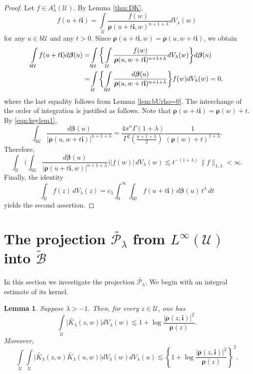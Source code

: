 \documentclass{amsart}
\newtheorem{lemma}[theorem]{Lemma}
\numberwithin{equation}{section}
\newcommand{\calU}{\mathcal{U}}
\newcommand{\bfi}{\mathbf{i}}
\newcommand{\bfbeta}{\boldsymbol{\beta}}
\newcommand{\bfrho}{\boldsymbol{\rho}}
\newcommand{\calB}{\mathcal{B}}
\newcommand{\bSieg}{b\mathcal{U}}
\begin{document}
\begin{proof}
Let $f\in A_{\lambda}^1(\calU)$. By Lemma \ref{thm:DK},
\[
f(u+t\bfi) =  \int\limits_{\calU} \frac {f(w)}{\bfrho(u+t\bfi,w)^{n+1+\lambda}} dV_{\lambda}(w)
\]
for any $u\in b\calU$ and any $t>0$. Since $\bfrho(u+t\bfi,w)=\bfrho(u,w+t\bfi)$, we obtain
\begin{align*}\label{eqn:cancel1}
\int\limits_{\bSieg} f(u+t\bfi) d\bfbeta(u) =&  \int\limits_{\bSieg} \bigg\{ \int\limits_{\calU}
\frac{f(w)} {\bfrho(u,w+t\bfi)^{n+1+\lambda}} dV_{\lambda}(w) \bigg\} d\bfbeta(u)\\
=&  \int\limits_{\calU} \bigg\{ \int\limits_{\bSieg}
\frac {d\bfbeta(u)} {\bfrho(u,w+t\bfi)^{n+1+\lambda}} \bigg\} f(w) dV_{\lambda}(w) =0, \notag
\end{align*}
where the last equality follows from Lemma \ref{lem:bUrho=0}.
The interchange of the order of integration is justified as follows. 
Note that $\bfrho(w+t\bfi)=\bfrho(w)+t$.
By \eqref{eqn:keylem1},
\[
\int_{b\calU}
\frac{d\bfbeta(u)}
     {|\bfrho(u,w+t\bfi)|^{n+1+\lambda}}
=
\frac{4\pi^n\Gamma(1+\lambda)}
     {\Gamma^2\!\left(\frac{n+1+\lambda}{2}\right)}
\frac{1}{(\bfrho(w)+t)^{1+\lambda}}.
\]
Therefore,
\[
\int_{\calU}
\Bigg(
\int_{b\calU}
\frac{d\bfbeta(u)}
     {|\bfrho(u+t\bfi,w)|^{n+1+\lambda}}
\Bigg)
|f(w)|\, dV_\lambda(w)
\lesssim
t^{-(1+\lambda)}\,
\|f\|_{1,\lambda}<\infty.
\]
Finally, the identity
\[
\int_{\calU} f(z)\, dV_\lambda(z)
= c_{\lambda}
\int_0^\infty
\int_{b\calU} f(u+t\bfi)\, d\bfbeta(u)\, t^\lambda\, dt
\]
yields the second assertion.
\end{proof}






\section{The projection $\widetilde{\mathcal{P}_{\lambda}}$ from $L^{\infty}(\calU)$ into $\widetilde{\calB}$}

In this section we investigate the projection $\widetilde{\mathcal{P}_{\lambda}}$. We begin with an integral estimate of its kernel.

\begin{lemma}\label{lem:K}
Suppose $\lambda>-1$. Then, for every $z\in\calU$, one has
\begin{equation}\label{eqn:2normofK}
\int\limits_{\calU} \big|\widetilde{K_{\lambda}}(z,w)\big| dV_\lambda(w) \lesssim
1 + \log \frac {|\bfrho(z,\bfi)|^2} {\bfrho(z)}.
\end{equation}
Moreover,
\begin{equation}\label{eqn:doubleintofK}
\int\limits_{\calU} \int\limits_{\calU} \big|\widetilde{K_{\lambda}}(z,u) \widetilde{K_{\lambda}}(u,w)\big| dV_{\lambda}(w) dV_{\lambda}(u)
\lesssim \left\{1 + \log \frac {|\bfrho(z,\bfi)|^2} {\bfrho(z)}\right\}^2.
\end{equation}
\end{lemma}
\end{document}
